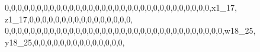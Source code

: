 \documentclass[]{article}
\newenvironment{Shaded}{\begin{snugshade}}{\end{snugshade}}
\newcommand{\DecValTok}[1]{\textcolor[rgb]{0.00,0.00,0.81}{#1}}
\newcommand{\NormalTok}[1]{#1}
\begin{document}
\begin{Shaded}
\begin{Highlighting}[]
\DecValTok{0}\NormalTok{,}\DecValTok{0}\NormalTok{,}\DecValTok{0}\NormalTok{,}\DecValTok{0}\NormalTok{,}\DecValTok{0}\NormalTok{,}\DecValTok{0}\NormalTok{,}\DecValTok{0}\NormalTok{,}\DecValTok{0}\NormalTok{,}\DecValTok{0}\NormalTok{,}\DecValTok{0}\NormalTok{,}\DecValTok{0}\NormalTok{,}\DecValTok{0}\NormalTok{,}\DecValTok{0}\NormalTok{,}\DecValTok{0}\NormalTok{,}\DecValTok{0}\NormalTok{,}\DecValTok{0}\NormalTok{,}\DecValTok{0}\NormalTok{,}\DecValTok{0}\NormalTok{,}\DecValTok{0}\NormalTok{,}\DecValTok{0}\NormalTok{,}\DecValTok{0}\NormalTok{,}\DecValTok{0}\NormalTok{,}\DecValTok{0}\NormalTok{,}\DecValTok{0}\NormalTok{,}\DecValTok{0}\NormalTok{,}\DecValTok{0}\NormalTok{,}\DecValTok{0}\NormalTok{,}\DecValTok{0}\NormalTok{,}\DecValTok{0}\NormalTok{,}\DecValTok{0}\NormalTok{,}\DecValTok{0}\NormalTok{,}\DecValTok{0}\NormalTok{,x1_}\DecValTok{17}\NormalTok{, z1_}\DecValTok{17}\NormalTok{,}\DecValTok{0}\NormalTok{,}\DecValTok{0}\NormalTok{,}\DecValTok{0}\NormalTok{,}\DecValTok{0}\NormalTok{,}\DecValTok{0}\NormalTok{,}\DecValTok{0}\NormalTok{,}\DecValTok{0}\NormalTok{,}\DecValTok{0}\NormalTok{,}\DecValTok{0}\NormalTok{,}\DecValTok{0}\NormalTok{,}\DecValTok{0}\NormalTok{,}\DecValTok{0}\NormalTok{,}\DecValTok{0}\NormalTok{,}\DecValTok{0}\NormalTok{,}\DecValTok{0}\NormalTok{,}\DecValTok{0}\NormalTok{,}
\DecValTok{0}\NormalTok{,}\DecValTok{0}\NormalTok{,}\DecValTok{0}\NormalTok{,}\DecValTok{0}\NormalTok{,}\DecValTok{0}\NormalTok{,}\DecValTok{0}\NormalTok{,}\DecValTok{0}\NormalTok{,}\DecValTok{0}\NormalTok{,}\DecValTok{0}\NormalTok{,}\DecValTok{0}\NormalTok{,}\DecValTok{0}\NormalTok{,}\DecValTok{0}\NormalTok{,}\DecValTok{0}\NormalTok{,}\DecValTok{0}\NormalTok{,}\DecValTok{0}\NormalTok{,}\DecValTok{0}\NormalTok{,}\DecValTok{0}\NormalTok{,}\DecValTok{0}\NormalTok{,}\DecValTok{0}\NormalTok{,}\DecValTok{0}\NormalTok{,}\DecValTok{0}\NormalTok{,}\DecValTok{0}\NormalTok{,}\DecValTok{0}\NormalTok{,}\DecValTok{0}\NormalTok{,}\DecValTok{0}\NormalTok{,}\DecValTok{0}\NormalTok{,}\DecValTok{0}\NormalTok{,}\DecValTok{0}\NormalTok{,}\DecValTok{0}\NormalTok{,}\DecValTok{0}\NormalTok{,}\DecValTok{0}\NormalTok{,}\DecValTok{0}\NormalTok{,}\DecValTok{0}\NormalTok{,}\DecValTok{0}\NormalTok{,w18_}\DecValTok{25}\NormalTok{, y18_}\DecValTok{25}\NormalTok{,}\DecValTok{0}\NormalTok{,}\DecValTok{0}\NormalTok{,}\DecValTok{0}\NormalTok{,}\DecValTok{0}\NormalTok{,}\DecValTok{0}\NormalTok{,}\DecValTok{0}\NormalTok{,}\DecValTok{0}\NormalTok{,}\DecValTok{0}\NormalTok{,}\DecValTok{0}\NormalTok{,}\DecValTok{0}\NormalTok{,}\DecValTok{0}\NormalTok{,}\DecValTok{0}\NormalTok{,}\DecValTok{0}\NormalTok{,}\DecValTok{0}\NormalTok{,}

\end{Highlighting}
\end{Shaded}
\end{document}
